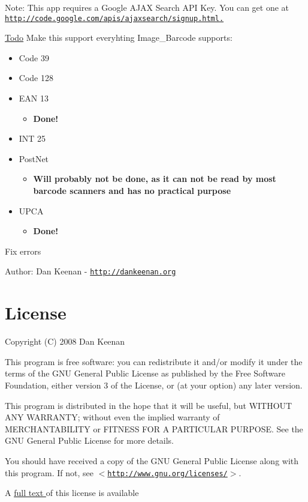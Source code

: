 \begin{Desc}
\item[Note:]This app requires a Google AJAX Search API Key. You can get one at \href{http://code.google.com/apis/ajaxsearch/signup.html.}{\tt http://code.google.com/apis/ajaxsearch/signup.html.} \end{Desc}
\begin{Desc}
\item[\hyperlink{todo__todo000001}{Todo}]Make this support everyhting Image\_\-Barcode supports:\begin{itemize}
\item Code 39\item Code 128\item EAN 13\begin{itemize}
\item {\bf Done!} \end{itemize}
\item INT 25\item PostNet\begin{itemize}
\item {\bf Will probably not be done, as it can not be read by most barcode scanners and has no practical purpose}\end{itemize}
\item UPCA\begin{itemize}
\item {\bf Done!} \end{itemize}
\end{itemize}


Fix errors\end{Desc}
\begin{Desc}
\item[Author:]Dan Keenan - \href{http://dankeenan.org}{\tt http://dankeenan.org} \end{Desc}
\hypertarget{index_license}{}\section{License}\label{index_license}
Copyright (C) 2008 Dan Keenan

This program is free software: you can redistribute it and/or modify it under the terms of the GNU General Public License as published by the Free Software Foundation, either version 3 of the License, or (at your option) any later version.

This program is distributed in the hope that it will be useful, but WITHOUT ANY WARRANTY; without even the implied warranty of MERCHANTABILITY or FITNESS FOR A PARTICULAR PURPOSE. See the GNU General Public License for more details.

You should have received a copy of the GNU General Public License along with this program. If not, see $<$\href{http://www.gnu.org/licenses/}{\tt http://www.gnu.org/licenses/}$>$.



A \hyperlink{license}{full text } of this license is available 